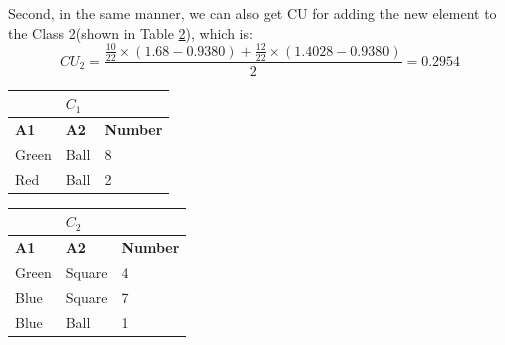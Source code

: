 Second, in the same manner, we can also get CU for adding the new element to the Class 2(shown in Table \ref{tab:label3}), which is: $$CU_2=\frac{\frac{10}{22}\times(1.68-0.9380)+\frac{12}{22}\times(1.4028-0.9380)}{2}=0.2954$$

\begin{table}[!ht]
{
\centering
\begin{minipage}{0.45\textwidth}
\begin{tabular}{l l l}\hline
\textbf{ } & \textbf{$C_1$} & \textbf{ }\\\hline
\textbf{A1} & \textbf{A2} & \textbf{Number}\\
\hline
Green & Ball & 8 \\
Red & Ball & 2 \\
\hline
\end{tabular}
\end{minipage}
\hfil
\begin{minipage}{0.45\textwidth}
\begin{tabular}{l l l}\hline
\textbf{ } & \textbf{$C_2$} & \textbf{ }\\\hline
\textbf{A1} & \textbf{A2} & \textbf{Number}\\\hline
Green & Square & 4 \\
Blue & Square & 7 \\
Blue & Ball & 1\\\hline
\end{tabular}
\label{tab:label3}
\end{minipage}}
\end{table}

